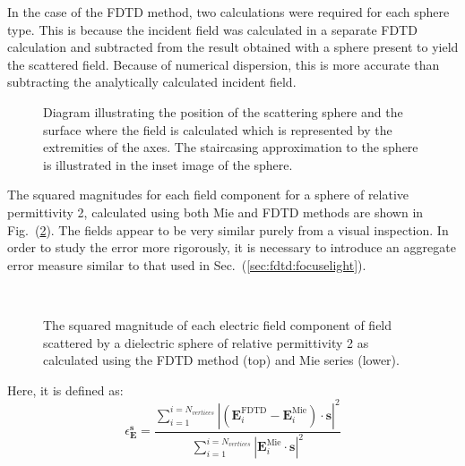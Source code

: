 \documentclass[a4paper, 12pt]{article}
\newcommand{\rfig}[1]{Fig.\ (\ref{#1})}
\newcommand{\sect}[1]{Sec.\ (\ref{#1})}
\begin{document}
	In the case of the FDTD method, two calculations were required for
	each sphere type. This is because the incident field was calculated in
	a separate FDTD calculation and subtracted from the result obtained
	with a sphere present to yield the scattered field. Because of
	numerical dispersion, this is more
	accurate than subtracting the analytically calculated incident field.
	\begin{figure}[!h]
		\begin{center}
			\caption{Diagram illustrating the position of the scattering sphere
				and the surface where the field is calculated which is represented
				by the extremities of the axes. The staircasing approximation to
				the sphere is illustrated in the inset image of the sphere.}
			\label{fig:fdtd:sphere_dims}
		\end{center}
	\end{figure}
	The squared magnitudes for each field component for a sphere of
	relative permittivity 2, calculated using both
	Mie and FDTD methods are shown in
	\rfig{fig:fdtd:scattered_field}. The fields appear to be very similar
	purely from a visual inspection. In order to study the error more
	rigorously, it is necessary to introduce an aggregate error measure
	similar to that used in \sect{sec:fdtd:focuselight}.
	\begin{figure}[!h]
		\begin{center}
			$\begin{array}{ccc}
			\end{array}$
			\caption{The squared magnitude of each electric field component of
				field scattered by a dielectric sphere of relative permittivity 2
				as calculated using the FDTD method (top) and Mie series (lower).}
			\label{fig:fdtd:scattered_field}
		\end{center}
	\end{figure}
	Here, it is defined as: 
	\begin{equation}
		\epsilon_{\mathbf{E}}^{\mathbf{s}}=\frac{\sum\limits_{i=1}^{i=N_{vertices}}\left|\left(\mathbf{E}^{\textrm{FDTD}}_i-\mathbf{E}^{\textrm{Mie}}_i\right)\!\cdot\!\mathbf{s}\right|^2}{\sum\limits_{i=1}^{i=N_{vertices}}\left|\mathbf{E}^{\textrm{Mie}}_i\!\cdot\!\mathbf{s}\right|^2}
		\label{eq:fdtd:aggerr2}
	\end{equation}
\end{document}
